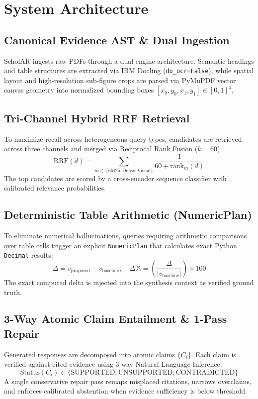 \documentclass[11pt,a4paper]{article}
\begin{document}
\section{System Architecture}

\subsection{Canonical Evidence AST & Dual Ingestion}
ScholAR ingests raw PDFs through a dual-engine architecture. Semantic headings and table structures are extracted via IBM Docling (\texttt{do\_ocr=False}), while spatial layout and high-resolution sub-figure crops are parsed via PyMuPDF vector canvas geometry into normalized bounding boxes $[x_0, y_0, x_1, y_1] \in [0, 1]^4$.

\subsection{Tri-Channel Hybrid RRF Retrieval}
To maximize recall across heterogeneous query types, candidates are retrieved across three channels and merged via Reciprocal Rank Fusion ($k=60$):
\begin{equation}
\text{RRF}(d) = \sum_{m \in \{\text{BM25}, \text{Dense}, \text{Visual}\}} \frac{1}{60 + \text{rank}_m(d)}
\end{equation}
The top candidates are scored by a cross-encoder sequence classifier with calibrated relevance probabilities.

\subsection{Deterministic Table Arithmetic (NumericPlan)}
To eliminate numerical hallucinations, queries requiring arithmetic comparisons over table cells trigger an explicit \texttt{NumericPlan} that calculates exact Python \texttt{Decimal} results:
\begin{equation}
\Delta = v_{\text{proposed}} - v_{\text{baseline}}, \quad \Delta\% = \left(\frac{\Delta}{|v_{\text{baseline}}|}\right) \times 100
\end{equation}
The exact computed delta is injected into the synthesis context as verified ground truth.

\subsection{3-Way Atomic Claim Entailment & 1-Pass Repair}
Generated responses are decomposed into atomic claims $\{C_i\}$. Each claim is verified against cited evidence using 3-way Natural Language Inference:
\begin{equation}
\text{Status}(C_i) \in \{\text{SUPPORTED}, \text{UNSUPPORTED}, \text{CONTRADICTED}\}
\end{equation}
A single conservative repair pass remaps misplaced citations, narrows overclaims, and enforces calibrated abstention when evidence sufficiency is below threshold.
\end{document}
